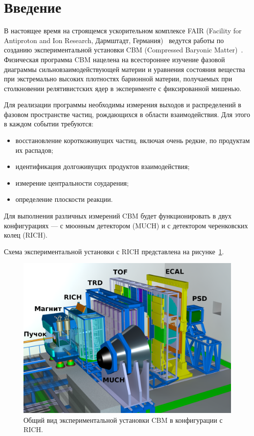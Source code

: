 \section*{Введение}\label{section:secIntro}

В настоящее время на строящемся ускорительном комплексе FAIR (Facility for Antiproton and Ion Research, Дармштадт, Германия)~\cite{FAIR} ведутся работы по созданию экспериментальной установки CBM (Compressed Baryonic Matter)~\cite{CBMBook, CBMSIS100, CBM_TSR, ProgressReport2014}. Физическая программа CBM нацелена на всестороннее изучение фазовой диаграммы сильновзаимодействующей материи и уравнения состояния вещества при экстремально высоких плотностях барионной материи, получаемых при столкновении релятивистских ядер в эксперименте с фиксированной мишенью.

Для реализации программы необходимы измерения выходов и распределений в фазовом пространстве частиц, рождающихся в области взаимодействия. Для этого в каждом событии требуются:
\begin{itemize}
\item {восстановление короткоживущих частиц, включая очень редкие, по продуктам их распадов;}
\item {идентификация долгоживущих продуктов взаимодействия;}
\item {измерение центральности соударения;}
\item {определение плоскости реакции.}
\end{itemize}

Для выполнения различных измерений CBM будет функционировать в двух конфигурациях --- с мюонным детектором (MUCH) и с детектором черенковских колец (RICH).

Схема экспериментальной установки с RICH представлена на рисунке~\ref{fig:CBM}.

\begin{figure}
\includegraphics[width=1.0\textwidth]{pictures/1_CBM_SIS100_with_names.png}
\caption{Общий вид экспериментальной установки CBM в конфигурации с RICH.}
\label{fig:CBM}
\end{figure}

